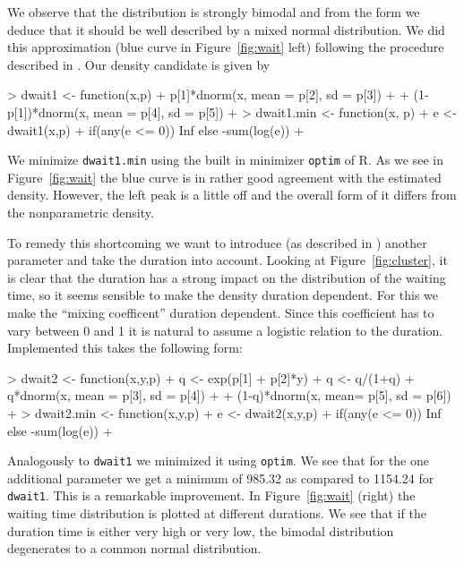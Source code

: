 \documentclass[english,final]{scrartcl}
\begin{document}
We observe that the distribution is strongly bimodal and from the form we deduce that it should be well described by a mixed normal distribution. We did this approximation (blue curve in Figure~\ref{fig:wait} left) following the procedure described in \cite{density}. Our density candidate is given by

\begin{Schunk}
\begin{Sinput}
> dwait1 <- function(x,p) {
+   p[1]*dnorm(x, mean = p[2], sd = p[3]) +
+     (1-p[1])*dnorm(x, mean = p[4], sd = p[5])
+ }
> dwait1.min <- function(x, p) {
+   e <- dwait1(x,p)
+   if(any(e <= 0)) Inf else -sum(log(e))
+ }
\end{Sinput}
\end{Schunk}

We minimize \texttt{dwait1.min} using the built in minimizer \texttt{optim} of R. As we see in Figure~\ref{fig:wait} the blue curve is in rather good agreement with the estimated density. However, the left peak is a little off and the overall form of it differs from the nonparametric density.

To remedy this shortcoming we want to introduce (as described in \cite{density}) another parameter and take the duration into account. Looking at Figure~\ref{fig:cluster}, it is clear that the duration has a strong impact on the distribution of the waiting time, so it seems sensible to make the density duration dependent. For this we make the \enquote{mixing coefficent} duration dependent. Since this coefficient has to vary between 0 and 1 it is natural to assume a logistic relation to the duration. Implemented this takes the following form:

\begin{Schunk}
\begin{Sinput}
> dwait2 <- function(x,y,p) {
+   q <- exp(p[1] + p[2]*y)
+   q <- q/(1+q)
+   q*dnorm(x, mean = p[3], sd = p[4]) +
+     (1-q)*dnorm(x, mean= p[5], sd = p[6])
+ }
> dwait2.min <- function(x,y,p){
+   e <- dwait2(x,y,p)
+   if(any(e <= 0)) Inf else -sum(log(e))
+ }
\end{Sinput}
\end{Schunk}

Analogously to \texttt{dwait1} we minimized it using \texttt{optim}. We see that for the one additional parameter we get a minimum of 985.32 as compared to 1154.24 for \texttt{dwait1}. This is a remarkable improvement. In Figure~\ref{fig:wait} (right) the waiting time distribution is plotted at different durations. We see that if the duration time is either very high or very low, the bimodal distribution degenerates to a common normal distribution.
\end{document}
